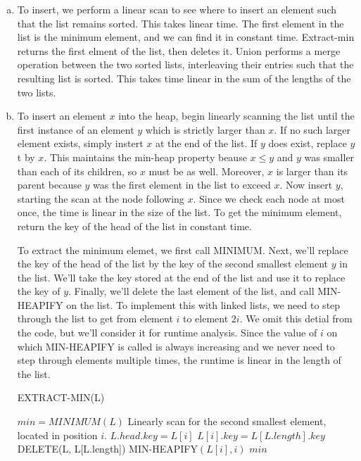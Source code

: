 \documentclass{article}
\begin{document}
\begin{enumerate}[a.]
\item 
To insert, we perform a linear scan to see where to insert an element such that the list remains sorted. This takes linear time. The first element in the list is the minimum element, and we can find it in constant time. Extract-min returns the first elment of the list, then deletes it.  Union performs a merge operation between the two sorted lists, interleaving their entries such that the resulting list is sorted.  This takes time linear in the sum of the lengths of the two lists. 

\item 
To insert an element $x$ into the heap, begin linearly scanning the list until the first instance of an element $y$ which is strictly larger than $x$.  If no such larger element exists, simply instert $x$ at the end of the list.  If $y$ does exist, replace $y$t by $x$.  This maintains the min-heap property beause $x \leq y$ and $y$ was smaller than each of its children, so $x$ must be as well.  Moreover, $x$ is larger than its parent because $y$ was the first element in the list to exceed $x$.  Now insert $y$, starting the scan at the node following $x$.   Since we check each node at most once, the time is linear in the size of the list.  To get the minimum element, return the key of the head of the list in constant time.  

To extract the minimum elemet, we first call MINIMUM.  Next, we'll replace the key of the head of the list by the key of the second smallest element $y$ in the list.  We'll take the key stored at the end of the list and use it to replace the key of $y$.  Finally, we'll delete the last element of the list, and call MIN-HEAPIFY on the list.  To implement this with linked lists, we need to step through the list to get from element $i$ to element $2i$.  We omit this detial from the code, but we'll consider it for runtime analysis.  Since the value of $i$ on which MIN-HEAPIFY is called is always increasing and we never need to step through elements multiple times, the runtime is linear in the length of the list.

\begin{algorithm}
\caption{EXTRACT-MIN(L)}
\begin{algorithmic}
\State $min = MINIMUM(L)$
\State Linearly scan for the second smallest element, located in position $i$.
\State $L.head.key = L[i]$
\State $L[i].key = L[L.length].key$
\State DELETE(L, L[L.length])
\State MIN-HEAPIFY$(L[i],i)$
\State \Return $min$
\end{algorithmic}
\end{algorithm}


\end{enumerate}
\end{document}
